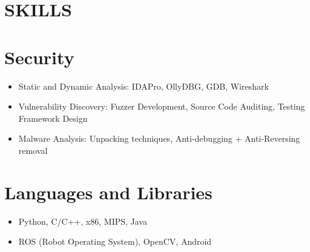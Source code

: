 \documentclass[margin]{res}
\begin{document}
\begin{resume}
\section{SKILLS}
\normalsize{\section{Security}}
                 \begin{itemize} \itemsep -2pt
                 \item Static and Dynamic Analysis: IDAPro, OllyDBG,
                   GDB, Wireshark
                 \item Vulnerability Discovery: Fuzzer Development,
                   Source Code Auditing, Testing Framework Design
                 \item Malware Analysis: Unpacking techniques,
                     Anti-debugging + Anti-Reversing removal
                 \end{itemize}
\normalsize{\section{Languages and Libraries}}
	           \begin{itemize} \itemsep -2pt %
                   \item Python, C/C++, x86, MIPS, Java
                   \item ROS (Robot Operating System), OpenCV, Android
                   \end{itemize}


\end{resume}
\end{document}
